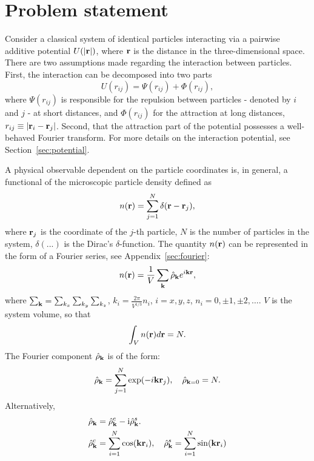 \section{\label{sec:problem_statement} Problem statement}

Consider a classical system of identical particles interacting via a pairwise additive potential $U(\abs{\vb r})$, where $\vb r$ is the distance in the three-dimensional space. There are two assumptions made regarding the interaction between particles. First, the interaction can be decomposed into two parts
\begin{equation}
	\label{interaction_decomp}
	U(r_{ij}) = \Psi(r_{ij}) + \Phi(r_{ij}),
\end{equation}
where $\Psi(r_{ij})$ is responsible for the repulsion between particles - denoted by $i$ and $j$ -  at short distances, and $\Phi(r_{ij})$ for the attraction at long distances, $r_{ij} \equiv \abs{\vb r_i - \vb r_j}$. Second, that the attraction part of the potential possesses a well-behaved Fourier transform. For more details on the interaction potential, see Section~\ref{sec:potential}.

A physical observable dependent on the particle coordinates is, in general, a functional of the microscopic particle density defined as 
\begin{equation}
	n(\vb r) = \sum_{j=1}^{N} \delta(\vb r - \vb r_j),
\end{equation}
where $\vb r_j$ is the coordinate of the $j$-th particle, $N$ is the number of particles in the system, $\delta(...)$ is the Dirac's $\delta$-function. The quantity $n(\vb r)$ can be represented in the form of a Fourier series, see Appendix~\ref{sec:fourier}:
\begin{equation}
	n(\vb r) = \frac{1}{V} \sum_{\vb k} \hat{\rho}_{\vb k} e^{i\vb k \vb r},
\end{equation}
where $\sum_{\vb k} = \sum_{k_x}\sum_{k_y}\sum_{k_z}$, $k_i = \frac{2\pi}{V^{1/3}}n_i$, $i=x,y,z$, $n_i=0,\pm 1, \pm 2, \dotsc$. $V$ is the system volume, so that
$$ \int_V n(\vb r) d\vb r = N.$$
The Fourier component $\hat{\rho}_{\vb k}$ is of the form:
\begin{equation}
	\label{def:rho_k}
	\hat{\rho}_{\vb k} = \sum_{j=1}^N\exp(-i\vb k \vb r_j), \quad \hat{\rho}_{\vb k = 0} = N. 
\end{equation}
Alternatively, 
\begin{eqnarray}
	\label{rho_k_sin}
	& \hat{\rho}_{\vb k} = \hat{\rho}_{\vb k}^c - {\rm i}\hat{\rho}_{\vb k}^s.
	\nonumber\\
	& \hat{\rho}_{\vb k}^c = \sum_{i=1}^N \cos(\vb k \vb r_i), \quad \hat{\rho}_{\vb k}^s = \sum_{i=1}^N \sin(\vb k \vb r_i)
\end{eqnarray}


